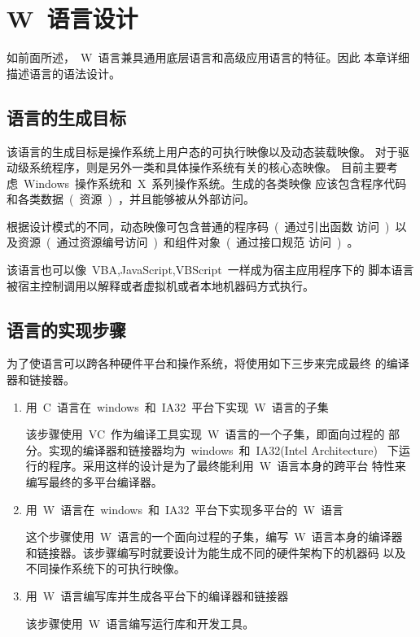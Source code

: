 ﻿%
%

\chapter{W~语言设计}

如前面所述，~W~语言兼具通用底层语言和高级应用语言的特征。因此
本章详细描述语言的语法设计。

\section{语言的生成目标}

该语言的生成目标是操作系统上用户态的可执行映像以及动态装载映像。
对于驱动级系统程序，则是另外一类和具体操作系统有关的核心态映像。
目前主要考虑~Windows~操作系统和~X~系列操作系统。生成的各类映像
应该包含程序代码和各类数据~(~资源~)~，并且能够被从外部访问。

根据设计模式的不同，动态映像可包含普通的程序码~(~通过引出函数
访问~)~以及资源~(~通过资源编号访问~)~和组件对象~(~通过接口规范
访问~)~。

该语言也可以像~VBA,JavaScript,VBScript~一样成为宿主应用程序下的
脚本语言被宿主控制调用以解释或者虚拟机或者本地机器码方式执行。

\section{语言的实现步骤}

为了使语言可以跨各种硬件平台和操作系统，将使用如下三步来完成最终
的编译器和链接器。
\begin{enumerate}
\item{用~C~语言在~windows~和~IA32~平台下实现~W~语言的子集}

该步骤使用~VC~作为编译工具实现~W~语言的一个子集，即面向过程的
部分。实现的编译器和链接器均为~windows~和~IA32(Intel Architecture)~
下运行的程序。采用这样的设计是为了最终能利用~W~语言本身的跨平台
特性来编写最终的多平台编译器。

\item{用~W~语言在~windows~和~IA32~平台下实现多平台的~W~语言}

这个步骤使用~W~语言的一个面向过程的子集，编写~W~语言本身的编译器
和链接器。该步骤编写时就要设计为能生成不同的硬件架构下的机器码
以及不同操作系统下的可执行映像。

\item{用~W~语言编写库并生成各平台下的编译器和链接器}

该步骤使用~W~语言编写运行库和开发工具。

\end{enumerate}

